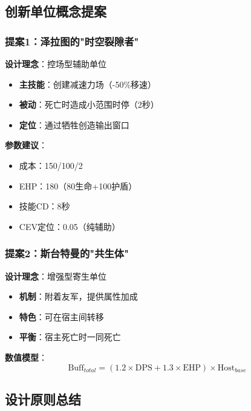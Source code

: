 \documentclass[a4paper,12pt]{article}
\begin{document}
\subsection{创新单位概念提案}

\subsubsection{提案1：泽拉图的"时空裂隙者"}
\textbf{设计理念}：控场型辅助单位
\begin{itemize}
\item \textbf{主技能}：创建减速力场（-50\%移速）
\item \textbf{被动}：死亡时造成小范围时停（2秒）
\item \textbf{定位}：通过牺牲创造输出窗口
\end{itemize}

\textbf{参数建议}：
\begin{itemize}
\item 成本：150/100/2
\item EHP：180（80生命+100护盾）
\item 技能CD：8秒
\item CEV定位：0.05（纯辅助）
\end{itemize}

\subsubsection{提案2：斯台特曼的"共生体"}
\textbf{设计理念}：增强型寄生单位
\begin{itemize}
\item \textbf{机制}：附着友军，提供属性加成
\item \textbf{特色}：可在宿主间转移
\item \textbf{平衡}：宿主死亡时一同死亡
\end{itemize}

\textbf{数值模型}：
\begin{equation}
\text{Buff}_{total} = (1.2 \times \text{DPS} + 1.3 \times \text{EHP}) \times \text{Host}_{base}
\end{equation}

\subsection{设计原则总结}
\end{document}
